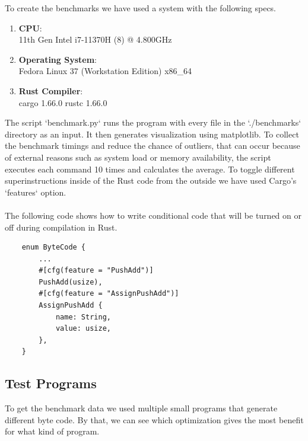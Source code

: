 \documentclass{article}
\begin{document}
To create the benchmarks we have used a system with the following specs.

\begin{enumerate}
    \item \textbf{CPU}:\\
        11th Gen Intel i7-11370H (8) @ 4.800GHz 
    \item \textbf{Operating System}:\\
        Fedora Linux 37 (Workstation Edition) x86\_64 
    \item \textbf{Rust Compiler}:\\
        cargo 1.66.0
        rustc 1.66.0
\end{enumerate}

The script `benchmark.py` runs the program with every file in the
`./benchmarks` directory as an input. It then generates visualization using
matplotlib. To collect the benchmark timings and reduce the chance of outliers,
that can occur because of external reasons such as system load or memory
availability, the script executes each command 10 times and calculates the
average. To toggle different superinstructions inside of the Rust code from the
outside we have used Cargo's `features` option.
\\\\
The following code shows how to write conditional code that will be turned on
or off during compilation in Rust.

\begin{verbatim}
    enum ByteCode {
        ...
        #[cfg(feature = "PushAdd")]
        PushAdd(usize),
        #[cfg(feature = "AssignPushAdd")]
        AssignPushAdd {
            name: String,
            value: usize,
        },
    }
\end{verbatim}

\subsection{Test Programs}
To get the benchmark data we used multiple small programs that generate
different byte code. By that, we can see which optimization gives the most
benefit for what kind of program.
\end{document}
